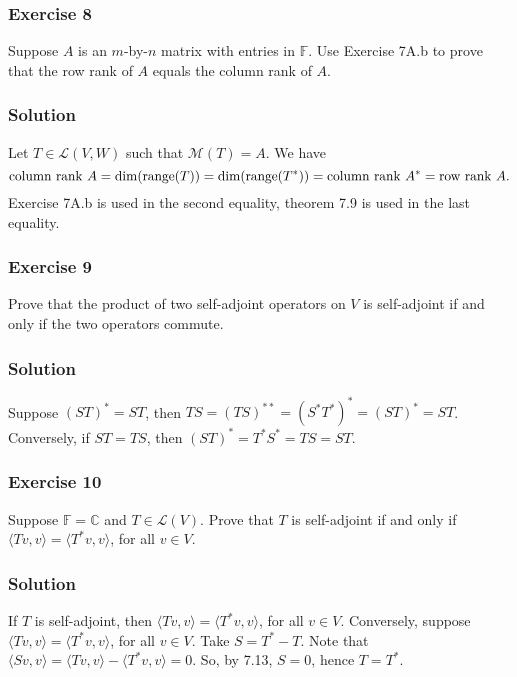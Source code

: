 \subsubsection*{Exercise 8}

Suppose $A$ is an $m$-by-$n$ matrix with entries in $\mathbb{F}$.
Use Exercise 7A.b to prove that the row rank of $A$ equals the column rank of $A$.

\subsubsection*{Solution}

Let $T \in \mathcal{L}(V, W)$ such that $\mathcal{M}(T) = A$.
We have
\begin{equation*}
    \text{column rank } A
        = \dim(\mathrm{range}(T))
        = \dim(\mathrm{range}(T^*))
        = \text{column rank } A^*
        = \text{row rank } A.
\end{equation*}
Exercise 7A.b is used in the second equality, theorem 7.9 is used in the last equality.


\subsubsection*{Exercise 9}

Prove that the product of two self-adjoint operators on $V$ is self-adjoint if and only if the two operators commute.

\subsubsection*{Solution}

Suppose $(ST)^* = ST$, then $TS = (TS)^{**} = (S^*T^*)^* = (ST)^* = ST$.
Conversely, if $ST = TS$, then $(ST)^* = T^*S^* = TS = ST$.


\subsubsection*{Exercise 10}

Suppose $\mathbb{F} = \mathbb{C}$ and $T \in \mathcal{L}(V)$.
Prove that $T$ is self-adjoint if and only if $\langle Tv, v \rangle = \langle T^*v, v \rangle$, for all $v \in V$.

\subsubsection*{Solution}

If $T$ is self-adjoint, then $\langle Tv, v \rangle = \langle T^*v, v \rangle$, for all $v \in V$.
Conversely, suppose $\langle Tv, v \rangle = \langle T^*v, v \rangle$, for all $v \in V$.
Take $S = T^* - T$.
Note that $\langle Sv, v \rangle = \langle Tv, v \rangle - \langle T^*v, v\rangle = 0$.
So, by 7.13, $S = 0$, hence $T = T^*$.


